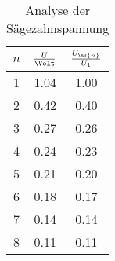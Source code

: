 \begin{table}
  \centering
  \begin{tabular}{c c c}
    \toprule
    $n$ & $\frac{U}{\Volt}$ & $\frac{U_\su{n}}{U_1}$ \\
    \midrule
    1   &   1.04  &   1.00    \\
    2   &   0.42  &   0.40    \\
    3   &   0.27  &   0.26    \\
    4   &   0.24  &   0.23    \\
    5   &   0.21  &   0.20    \\
    6   &   0.18  &   0.17    \\
    7   &   0.14  &   0.14    \\
    8   &   0.11  &   0.11    \\
    \bottomrule
  \end{tabular}
  \caption{Analyse der Sägezahnspannung}
  \label{anasaeg}
\end{table}
